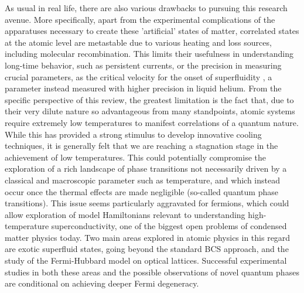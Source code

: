\documentclass[pra,letterpaper,twocolumn,showpacs,superscriptaddress]{revtex4}
\begin{document}
As usual in real life, there are also various drawbacks to pursuing this research avenue. More specifically, apart from the experimental 
complications of the apparatuses necessary to create these 'artificial' states of matter, correlated states at the atomic level are metastable due 
to various heating and loss sources, including molecular recombination. This limits their usefulness in understanding long-time behavior, such 
as persistent currents, or the precision in measuring crucial parameters, as the critical velocity for the onset of superfluidity \cite{Raman1999,Onofrio2000a}, 
a parameter instead measured with higher precision in liquid helium. From the specific perspective of this review, the greatest 
limitation is the fact that, due to their very dilute nature so advantageous from many standpoints, atomic systems require extremely 
low temperatures to manifest correlations of a quantum nature. While this has provided a strong stimulus to develop innovative 
cooling techniques, it is generally felt that we are reaching a stagnation stage in the achievement of low temperatures. 
This could potentially compromise the exploration of a rich landscape of phase transitions not necessarily driven by a classical 
and macroscopic parameter such as temperature, and which instead occur once the thermal effects are made negligible (so-called quantum phase transitions). 
This issue seems particularly aggravated for fermions, which could allow exploration of model Hamiltonians relevant to understanding 
high-temperature superconductivity, one of the biggest open problems of condensed matter physics today. 
Two main areas explored in atomic physics in this regard are exotic superfluid states, going beyond the standard BCS approach, and the 
study of the Fermi-Hubbard model on optical lattices. Successful experimental studies in both these areas and the possible 
observations of novel quantum phases are conditional on achieving deeper Fermi degeneracy.
 
\end{document}
